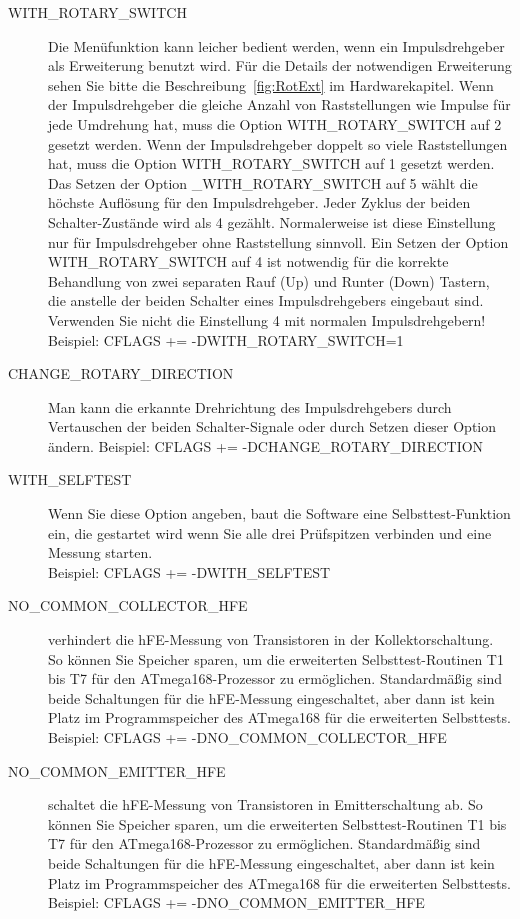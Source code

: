 \begin{description}
  \item[WITH\_ROTARY\_SWITCH] Die Menüfunktion kann leicher bedient werden, wenn ein Impulsdrehgeber als Erweiterung
benutzt wird.
Für die Details der notwendigen Erweiterung sehen Sie bitte die Beschreibung~\ref{fig:RotExt} im Hardwarekapitel.
Wenn der Impulsdrehgeber die gleiche Anzahl von Raststellungen wie Impulse für jede Umdrehung hat,
muss die Option WITH\_ROTARY\_SWITCH auf 2 gesetzt werden.
Wenn der Impulsdrehgeber doppelt so viele Raststellungen hat, muss die Option WITH\_ROTARY\_SWITCH auf 1 gesetzt werden.
Das Setzen der Option \_WITH\_ROTARY\_SWITCH auf 5 wählt die höchste Auflösung für den Impulsdrehgeber.
Jeder Zyklus der beiden Schalter-Zustände wird als 4 gezählt. Normalerweise ist diese Einstellung nur für
Impulsdrehgeber ohne Raststellung sinnvoll.
Ein Setzen der Option WITH\_ROTARY\_SWITCH auf 4 ist notwendig für die korrekte Behandlung von zwei separaten
Rauf (Up) und Runter (Down) Tastern, die anstelle der beiden Schalter eines Impulsdrehgebers eingebaut sind.
Verwenden Sie nicht die Einstellung 4 mit normalen Impulsdrehgebern!\\
Beispiel: CFLAGS += -DWITH\_ROTARY\_SWITCH=1

  \item[CHANGE\_ROTARY\_DIRECTION] Man kann die erkannte Drehrichtung des Impulsdrehgebers durch Vertauschen
der beiden Schalter-Signale oder durch Setzen dieser Option ändern.
Beispiel: CFLAGS += -DCHANGE\_ROTARY\_DIRECTION

 \item[WITH\_SELFTEST] Wenn Sie diese Option angeben, baut die Software eine Selbsttest-Funktion ein, die gestartet wird
wenn Sie alle drei Prüfspitzen verbinden und eine Messung starten.\\
Beispiel: CFLAGS += -DWITH\_SELFTEST

  \item[NO\_COMMON\_COLLECTOR\_HFE] verhindert die hFE-Messung von Transistoren in der Kollektorschaltung.
So können Sie Speicher sparen, um die erweiterten Selbsttest-Routinen T1 bis T7 für den ATmega168-Prozessor zu ermöglichen.
Standardmäßig sind beide Schaltungen für die hFE-Messung eingeschaltet,
aber dann ist kein Platz im Programmspeicher des ATmega168 für die erweiterten Selbsttests.\\
Beispiel: CFLAGS += -DNO\_COMMON\_COLLECTOR\_HFE

  \item[NO\_COMMON\_EMITTER\_HFE] schaltet die hFE-Messung von Transistoren in Emitterschaltung ab.
So können Sie Speicher sparen, um die erweiterten Selbsttest-Routinen T1 bis T7 für den ATmega168-Prozessor zu ermöglichen.
Standardmäßig sind beide Schaltungen für die hFE-Messung eingeschaltet,
aber dann ist kein Platz im Programmspeicher des ATmega168 für die erweiterten Selbsttests.\\
Beispiel: CFLAGS += -DNO\_COMMON\_EMITTER\_HFE


\end{description}
